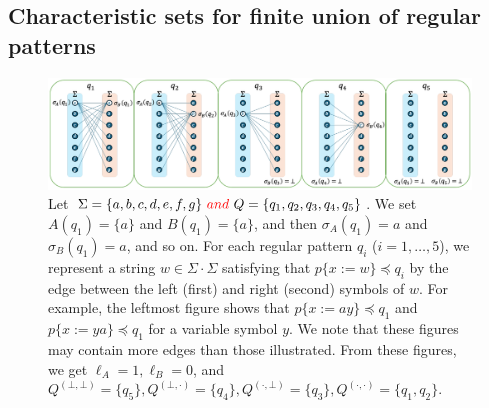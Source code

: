 \subsection{Characteristic sets for finite union of regular patterns}\label{subsec:char_union}

\begin{figure}[t]
  \begin{center}
    \includegraphics[scale=0.54]{figs/lem8eachreg.pdf}
    \caption{Let $\Sigma=\{a,b,c,d,e,f,g\}~{\color{red} and }~Q=\{q_1,q_2,q_3,q_4,q_5\}$. 
    We set $A(q_1)=\{a\}$ and $B(q_1)=\{a\}$, and then $\sigma_A(q_1)=a$ and $\sigma_B(q_1)=a$, and so on. For each regular pattern $q_i$ ($i=1,\ldots,5$), we represent a string $w \in \Sigma\cdot\Sigma$ satisfying that $p\{x:=w\}\preceq q_i$ by the edge between the left (first) and right (second) symbols of $w$. For example, the leftmost figure shows that $p\{x:=ay\}\preceq q_1$ and $p\{x:=ya\}\preceq q_1$ for a variable symbol $y$. We note that these figures may contain more edges than those illustrated. From these figures, we get $\ell_A=1, \ell_B=0$, and $Q^{(\bot,\bot)}=\{q_5\}, Q^{(\bot,\cdot)}=\{q_4\}, Q^{(\cdot,\bot)}=\{q_3\}, Q^{(\cdot,\cdot)}=\{q_1,q_2\}$.}\label{fig:lem8eachreg}
  \end{center}
\end{figure}

